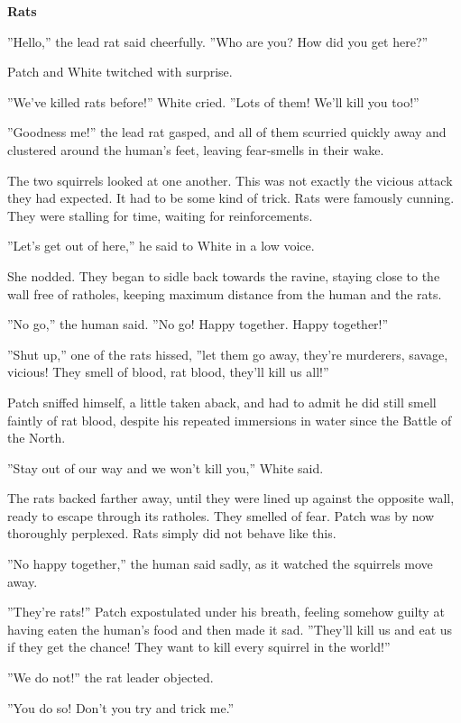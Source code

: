 \documentclass[11pt]{article}
\begin{document}
{\bf Rats\par
}\par
 ''Hello,'' the lead rat said cheerfully. ''Who are you? How did you get here?''\par
 Patch and White twitched with surprise.\par
 ''We've killed rats before!'' White cried. ''Lots of them! We'll kill you too!''\par
 ''Goodness me!'' the lead rat gasped, and all of them scurried quickly away and clustered around the human's feet, leaving fear-smells in their wake.\par
 The two squirrels looked at one another. This was not exactly the vicious attack they had expected. It had to be some kind of trick. Rats were famously cunning. They were stalling for time, waiting for reinforcements.\par
 ''Let's get out of here,'' he said to White in a low voice.\par
 She nodded. They began to sidle back towards the ravine, staying close to the wall free of ratholes, keeping maximum distance from the human and the rats.\par
 ''No go,'' the human said. ''No go! Happy together. Happy together!''\par
 ''Shut up,'' one of the rats hissed, ''let them go away, they're murderers, savage, vicious! They smell of blood, rat blood, they'll kill us all!''\par
 Patch sniffed himself, a little taken aback, and had to admit he did still smell faintly of rat blood, despite his repeated immersions in water since the Battle of the North.\par
 ''Stay out of our way and we won't kill you,'' White said.\par
 The rats backed farther away, until they were lined up against the opposite wall, ready to escape through its ratholes. They smelled of fear. Patch was by now thoroughly perplexed. Rats simply did not behave like this.\par
 ''No happy together,'' the human said sadly, as it watched the squirrels move away.\par
 ''They're rats!'' Patch expostulated under his breath, feeling somehow guilty at having eaten the human's food and then made it sad. ''They'll kill us and eat us if they get the chance! They want to kill every squirrel in the world!''\par
 ''We do not!'' the rat leader objected.\par
 ''You do so! Don't you try and trick me.''\par
\end{document}
